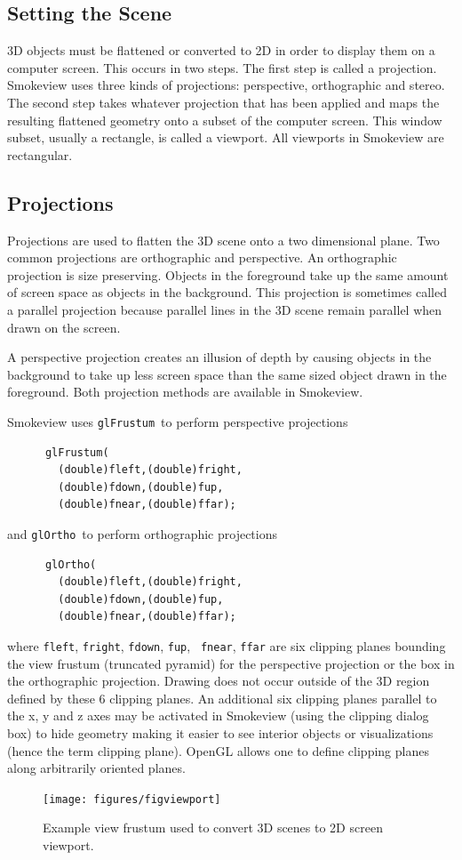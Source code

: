 \documentclass[11pt,twoside]{book}
\newcommand{\figoptions}{htp}
\begin{document}
\subsection{Setting the Scene}
3D objects must be flattened or converted to 2D in order to
display them on a computer screen.  This occurs in two steps.  The
first step is called a projection.  Smokeview uses three kinds of
projections: perspective, orthographic and stereo.  The second
step takes whatever projection that has been applied and maps the
resulting flattened geometry onto a subset of the computer screen.
This window subset, usually a rectangle, is called a viewport. All
viewports in Smokeview are rectangular.

\subsection{Projections}
Projections are used to flatten the 3D scene onto a two
dimensional plane. Two common projections are orthographic and
perspective. An orthographic projection is size preserving.
Objects in the foreground take up the same amount of screen space
as objects in the background. This projection is sometimes called
a parallel projection because parallel lines in the 3D scene
remain parallel when drawn on the screen.

A perspective projection creates an illusion of depth by causing
objects in the background to take up less screen space than the
same sized object drawn in the foreground.  Both projection
methods are available in Smokeview.

Smokeview uses {\tt glFrustum}\ to perform perspective projections
\begin{verbatim}
      glFrustum(
        (double)fleft,(double)fright,
        (double)fdown,(double)fup,
        (double)fnear,(double)ffar);
\end{verbatim}
and {\tt glOrtho}\ to perform orthographic projections
\begin{verbatim}
      glOrtho(
        (double)fleft,(double)fright,
        (double)fdown,(double)fup,
        (double)fnear,(double)ffar);
\end{verbatim}

\noindent where {\tt fleft}, {\tt fright}, {\tt fdown}, {\tt fup}, {\tt
fnear}, {\tt ffar} are six clipping planes bounding the view
frustum (truncated pyramid) for the perspective projection or the
box in the orthographic projection.  Drawing does not occur
outside of the 3D region defined by these 6 clipping planes. An
additional six clipping planes parallel to the x, y and z axes may
be activated in Smokeview (using the clipping dialog box) to hide
geometry making it easier to see interior objects or
visualizations (hence the term clipping plane).  OpenGL allows one to define clipping planes along
arbitrarily oriented planes.
\begin{figure}[\figoptions]
\begin{center}
\texttt{[image: figures/figviewport]}
\end{center}
\caption{Example view frustum used to convert 3D scenes to 2D
screen viewport.}
 \label{figfrustum}
\end{figure}
\end{document}
